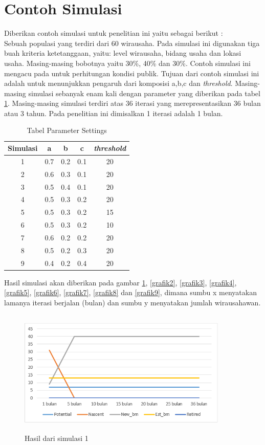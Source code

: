 \section{Contoh Simulasi}
Diberikan contoh simulasi untuk penelitian ini yaitu sebagai berikut :\\
Sebuah populasi yang terdiri dari 60 wirausaha. Pada simulasi ini digunakan tiga buah kriteria ketetanggaan, yaitu: level wirausaha, bidang usaha dan lokasi usaha. Masing-masing bobotnya yaitu 30\%, 40\% dan 30\%. Contoh simulasi ini mengacu pada \cite{GEM2013} untuk perhitungan kondisi publik. Tujuan dari contoh simulasi ini adalah untuk menunjukkan pengaruh dari komposisi a,b,c dan \textit{threshold}. Masing-masing simulasi sebanyak enam kali dengan parameter yang diberikan pada tabel \ref{tabelParameter}. Masing-masing simulasi terdiri atas 36 iterasi yang merepresentasikan 36 bulan atau 3 tahun. Pada penelitian ini dimisalkan 1 iterasi adalah 1 bulan.
\begin{table}[H]
\centering
\caption{Tabel Parameter Settings}
\begin{tabular}{|c|c|c|c|c|}
\hline
Simulasi & a & b & c & \textit{threshold}\\
\hline
1 & 0.7 & 0.2 & 0.1 & 20\\
\hline 
2 & 0.6 & 0.3 & 0.1 & 20\\
\hline
3 & 0.5 & 0.4 & 0.1 & 20\\
\hline
4 & 0.5 & 0.3 & 0.2 & 20\\
\hline
5 & 0.5 & 0.3 & 0.2 & 15\\
\hline
6 & 0.5 & 0.3 & 0.2 & 10\\
\hline
7 & 0.6 & 0.2 & 0.2 & 20\\
\hline
8 & 0.5 & 0.2 & 0.3 & 20\\
\hline
9 & 0.4 & 0.2 & 0.4 & 20\\
\hline 
\end{tabular}
\label{tabelParameter}
\end{table}
Hasil simulasi akan diberikan pada gambar \ref{grafik1}, \ref{grafik2}, \ref{grafik3}, \ref{grafik4}, \ref{grafik5}, \ref{grafik6}, \ref{grafik7}, \ref{grafik8} dan \ref{grafik9}, dimana sumbu x menyatakan lamanya iterasi berjalan (bulan) dan sumbu y menyatakan jumlah wirausahawan.
	\begin{figure} [H]
	\centering  
	\includegraphics[width=10cm, height=6cm]{grafik1} 
		\caption[Hasil dari simulasi]{Hasil dari simulasi 1}
	\label{grafik1} 
\end{figure}


